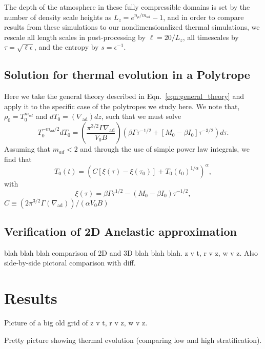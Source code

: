 \documentclass[twocolumn, amsmath, amsfonts, amssymb, trackchanges]{aastex62}
\newcommand{\grad}{\ensuremath{\nabla}}
\begin{document}
The depth of the atmosphere in these fully compressible domains is set by the number of density
scale heights as $L_z = e^{n_\rho/m_{ad}} - 1$, and in order to compare results from these
simulations to our nondimensionalized thermal simulations, we rescale all length scales in
post-processing by $\ell = 20/L_z$, all timescales by $\tau = \sqrt{\ell \epsilon}$, and
the entropy by $s = \epsilon^{-1}$.


\subsection{Solution for thermal evolution in a Polytrope}
Here we take the general theory described in Eqn.~\ref{eqn:general_theory} and apply it
to the specific case of the polytropes we study here. 
We note that, $\rho_0 = T_0^{m_{ad}}$ and
$dT_0 = (\grad_{\text{ad}}) dz$, such that we must solve
\begin{equation}
T_0^{-m_{ad}/2} dT_0 
= \left(\frac{\pi^{3/2}\Gamma\grad_{\text{ad}}}{V_0 B}\right)
\left(\beta\Gamma\tau^{-1/2} + [M_0 - \beta I_0]\tau^{-3/2}\right)d\tau.
\label{eqn:general_theory}
\end{equation}
Assuming that $m_{ad} < 2$ and through the use of simple power law integrals, we
find that
\begin{equation}
T_0(t) = \left(C[\xi(\tau) - \xi(\tau_0)] + T_0(t_0)^{1/\alpha}  \right)^{\alpha},
\end{equation}
with
\begin{equation}
\xi(\tau) = \beta\Gamma\tau^{1/2} - (M_0 - \beta I_0) \tau^{-1/2},
\end{equation}
$C \equiv (2 \pi^{3/2} \Gamma (\grad_{\text{ad}}))/(\alpha V_0 B)$



\subsection{Verification of 2D Anelastic approximation}
blah blah blah comparison of 2D and 3D blah blah blah. z v t, r v z, w v z. Also side-by-side
pictoral comparison with diff. 

\section{Results}
\label{sec:results}
Picture of a big old grid of z v t, r v z, w v z.

Pretty picture showing thermal evolution (comparing low and high stratification).
\end{document}
